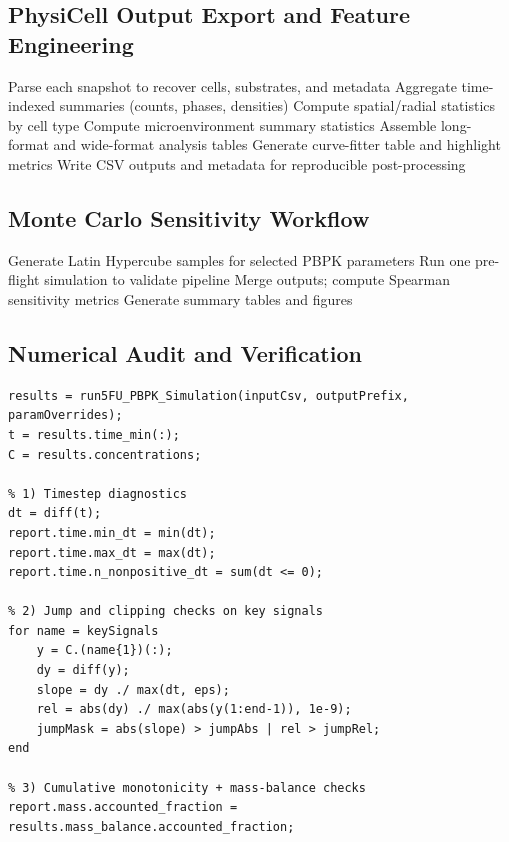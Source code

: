 \subsection{PhysiCell Output Export and Feature Engineering}
\begin{algorithm}[H]
\caption{Pipeline from MultiCellDS snapshots to curve-fitter tables}
\label{alg:appendix-export-pipeline}
\DontPrintSemicolon
{}
Parse each snapshot to recover cells, substrates, and metadata\;
Aggregate time-indexed summaries (counts, phases, densities)\;
Compute spatial/radial statistics by cell type\;
Compute microenvironment summary statistics\;
Assemble long-format and wide-format analysis tables\;
Generate curve-fitter table and highlight metrics\;
Write CSV outputs and metadata for reproducible post-processing\;
\end{algorithm}

\subsection{Monte Carlo Sensitivity Workflow}
\begin{algorithm}[H]
\caption{LHS-driven Monte Carlo sensitivity analysis for PBPK outputs}
\label{alg:appendix-mc-sensitivity}
\DontPrintSemicolon
{}
Generate Latin Hypercube samples for selected PBPK parameters\;
Run one pre-flight simulation to validate pipeline\;
Merge outputs; compute Spearman sensitivity metrics\;
Generate summary tables and figures\;
\end{algorithm}

\subsection{Numerical Audit and Verification}
\begin{lstlisting}[style=Matlab-editor,caption={Numerical audit checks for PBPK trajectory quality},label={lst:appendix-numerical-audit}]
results = run5FU_PBPK_Simulation(inputCsv, outputPrefix, paramOverrides);
t = results.time_min(:);
C = results.concentrations;

% 1) Timestep diagnostics
dt = diff(t);
report.time.min_dt = min(dt);
report.time.max_dt = max(dt);
report.time.n_nonpositive_dt = sum(dt <= 0);

% 2) Jump and clipping checks on key signals
for name = keySignals
    y = C.(name{1})(:);
    dy = diff(y);
    slope = dy ./ max(dt, eps);
    rel = abs(dy) ./ max(abs(y(1:end-1)), 1e-9);
    jumpMask = abs(slope) > jumpAbs | rel > jumpRel;
end

% 3) Cumulative monotonicity + mass-balance checks
report.mass.accounted_fraction = results.mass_balance.accounted_fraction;
\end{lstlisting}

